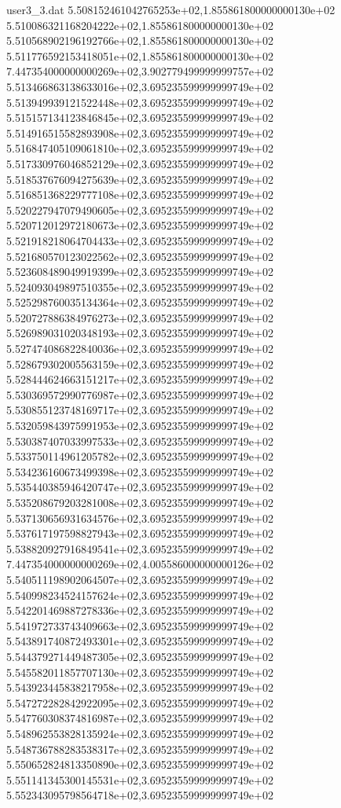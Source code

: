 \begin{filecontents}{user3_3.dat}
5.508152461042765253e+02,1.855861800000000130e+02
5.510086321168204222e+02,1.855861800000000130e+02
5.510568902196192766e+02,1.855861800000000130e+02
5.511776592153418051e+02,1.855861800000000130e+02
7.447354000000000269e+02,3.902779499999999757e+02
5.513466863138633016e+02,3.695235599999999749e+02
5.513949939121522448e+02,3.695235599999999749e+02
5.515157134123846845e+02,3.695235599999999749e+02
5.514916515582893908e+02,3.695235599999999749e+02
5.516847405109061810e+02,3.695235599999999749e+02
5.517330976046852129e+02,3.695235599999999749e+02
5.518537676094275639e+02,3.695235599999999749e+02
5.516851368229777108e+02,3.695235599999999749e+02
5.520227947079490605e+02,3.695235599999999749e+02
5.520712012972180673e+02,3.695235599999999749e+02
5.521918218064704433e+02,3.695235599999999749e+02
5.521680570123022562e+02,3.695235599999999749e+02
5.523608489049919399e+02,3.695235599999999749e+02
5.524093049897510355e+02,3.695235599999999749e+02
5.525298760035134364e+02,3.695235599999999749e+02
5.520727886384976273e+02,3.695235599999999749e+02
5.526989031020348193e+02,3.695235599999999749e+02
5.527474086822840036e+02,3.695235599999999749e+02
5.528679302005563159e+02,3.695235599999999749e+02
5.528444624663151217e+02,3.695235599999999749e+02
5.530369572990776987e+02,3.695235599999999749e+02
5.530855123748169717e+02,3.695235599999999749e+02
5.532059843975991953e+02,3.695235599999999749e+02
5.530387407033997533e+02,3.695235599999999749e+02
5.533750114961205782e+02,3.695235599999999749e+02
5.534236160673499398e+02,3.695235599999999749e+02
5.535440385946420747e+02,3.695235599999999749e+02
5.535208679203281008e+02,3.695235599999999749e+02
5.537130656931634576e+02,3.695235599999999749e+02
5.537617197598827943e+02,3.695235599999999749e+02
5.538820927916849541e+02,3.695235599999999749e+02
7.447354000000000269e+02,4.005586000000000126e+02
5.540511198902064507e+02,3.695235599999999749e+02
5.540998234524157624e+02,3.695235599999999749e+02
5.542201469887278336e+02,3.695235599999999749e+02
5.541972733743409663e+02,3.695235599999999749e+02
5.543891740872493301e+02,3.695235599999999749e+02
5.544379271449487305e+02,3.695235599999999749e+02
5.545582011857707130e+02,3.695235599999999749e+02
5.543923445838217958e+02,3.695235599999999749e+02
5.547272282842922095e+02,3.695235599999999749e+02
5.547760308374816987e+02,3.695235599999999749e+02
5.548962553828135924e+02,3.695235599999999749e+02
5.548736788283538317e+02,3.695235599999999749e+02
5.550652824813350890e+02,3.695235599999999749e+02
5.551141345300145531e+02,3.695235599999999749e+02
5.552343095798564718e+02,3.695235599999999749e+02

\end{filecontents}
